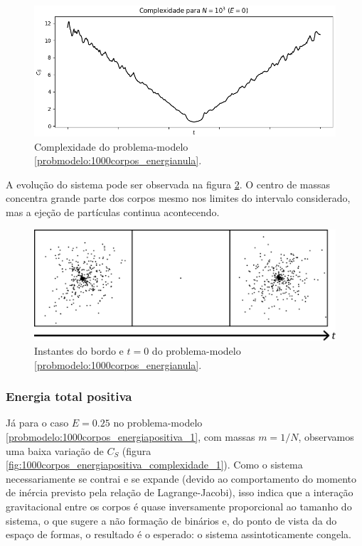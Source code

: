 \begin{figure}[H]
    \centering
    \includegraphics[width=0.6\linewidth]{tcc//img/complexidade_1000_nula.png}
    \caption{Complexidade do problema-modelo \ref{probmodelo:1000corpos_energianula}.}
    \label{fig:1000corpos_energia0_complexidade}
\end{figure}

A evolução do sistema pode ser observada na figura \ref{fig:1000corpos_energia0_posicoes}. O centro de massas concentra grande parte dos corpos mesmo nos limites do intervalo considerado, mas a ejeção de partículas continua acontecendo.

\begin{figure}[H]
    \centering
    \includegraphics[width=0.8\linewidth]{tcc//img/espalhamento_energia_nula_1000.png}
    \caption{Instantes do bordo e $t=0$ do problema-modelo \ref{probmodelo:1000corpos_energianula}.}
    \label{fig:1000corpos_energia0_posicoes}
\end{figure}


\subsubsection{Energia total positiva}
Já para o caso $E=0.25$ no problema-modelo \ref{probmodelo:1000corpos_energiapositiva_1}, com massas $m=1/N$, observamos uma baixa variação de $C_S$ (figura \ref{fig:1000corpos_energiapositiva_complexidade_1}). Como o sistema necessariamente se contrai e se expande (devido ao comportamento do momento de inércia previsto pela relação de Lagrange-Jacobi), isso indica que a interação gravitacional entre os corpos é quase inversamente proporcional ao tamanho do sistema, o que sugere a não formação de binários e, do ponto de vista da do espaço de formas, o resultado é o esperado: o sistema assintoticamente congela.

